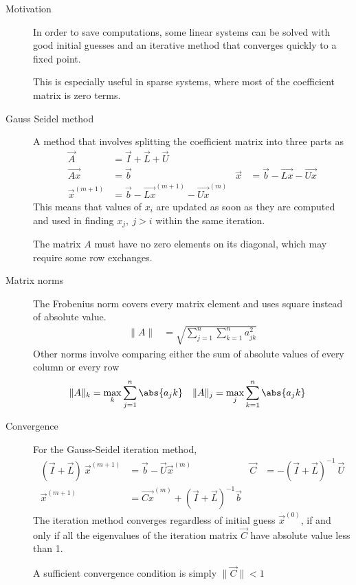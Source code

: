 \begin{description}
    \item[Motivation] In order to save computations, some linear systems can be solved
        with good initial guesses and an iterative method that converges quickly to a
        fixed point. \par
        This is especially useful in sparse systems, where most of the coefficient
        matrix is zero terms.

    \item[Gauss Seidel method] A method that involves splitting the coefficient matrix
        into three parts as
        \begin{align}
            \vec{A}         & = \vec{I} + \vec{L} + \vec{U}                   \\
            \vec{Ax}        & = \vec{b}                                     &
            \vec{x}         & = \vec{b} - \vec{Lx} - \vec{Ux}                 \\
            \vec{x}^{(m+1)} & = \vec{b} - \vec{Lx}^{(m+1)} - \vec{Ux}^{(m)}
        \end{align}
        This means that values of $ x_i $ are updated as soon as they are computed and
        used in finding $ x_j,\ j>i $ within the same iteration. \par
        The matrix $ A $ must have no zero elements on its diagonal, which may require
        some row exchanges.

    \item[Matrix norms] The Frobenius norm covers every matrix element and uses
        square instead of absolute value.
        \begin{align}
            \lVert A \rVert & = \sqrt{\sum_{j=1}^{n} \sum_{k=1}^{n} a^2_{jk}}
        \end{align}
        Other norms involve comparing either the sum of absolute values of every column
        or every row
        \begin{align}
            \lVert A \rVert_k & = \max_{k} \sum_{j=1}^{n} \abs{a_jk} &
            \lVert A \rVert_j & = \max_{j} \sum_{k=1}^{n} \abs{a_jk}
        \end{align}

    \item[Convergence] For the Gauss-Seidel iteration method,
        \begin{align}
            (\vec{I} + \vec{L})\ \vec{x}^{(m+1)}
                            & = \vec{b} - \vec{U}\vec{x}^{(m)}                    &
            \vec{C}         & = -(\vec{I} + \vec{L})^{-1}\ \vec{U}                  \\
            \vec{x}^{(m+1)} & = \vec{Cx}^{(m)} + (\vec{I} + \vec{L})^{-1} \vec{b}
        \end{align}
        The iteration method converges regardless of initial guess
        $ \vec{x}^{(0)} $, if and only if all the eigenvalues of the iteration
        matrix $ \vec{C} $ have absolute value less than 1. \par
        A sufficient convergence condition is simply $ \lVert \vec{C} \rVert < 1 $


\end{description}
